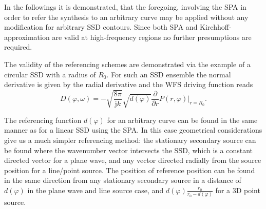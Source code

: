 \documentclass[12pt,a4paper]{article}
\newcommand{\te}{\mathrm{e}}
\newcommand{\ti}{\mathrm{j}}
\newcommand{\sinfi}{\sin\varphi}
\newcommand{\cosfi}{\cos\varphi}
\newcommand{\vxo}{\mathbf{x}_0}
\begin{document}
\vspace{3mm}
In the followings it is demonstrated, that the foregoing, involving the SPA in order to refer the synthesis to an arbitrary curve may be applied without any modification for arbitrary SSD contours. Since both SPA and Kirchhoff-approximation are valid at high-frequency regions no further presumptions are required.

The validity of the referencing schemes are demonstrated via the example of a circular SSD with a radius of $R_0$. For such an SSD ensemble the normal derivative is given by the radial derivative
and the WFS driving function reads
\begin{equation}
D(\varphi,\omega) = - \sqrt{\frac{8\pi}{\ti k}}\sqrt{d(\varphi)} \frac{\partial}{\partial r} \left. P(r,\varphi) \right|_{r = R_0}.
\end{equation}

\vspace{3mm}
The referencing function $d(\varphi)$ for an arbitrary curve can be found in the same manner as for a linear SSD using the SPA. In this case geometrical considerations give us a much simpler referencing method: the stationary secondary source can be found where the wavenumber vector intersects the SSD, which is a constant directed vector for a plane wave, and any vector directed radially from the source position for a line/point source. The position of reference position can be found in the same direction from any stationary secondary source in a distance of $d(\varphi)$ in the plane wave and line source case, and $d(\varphi)\frac{r_0}{r_0-d(\varphi)}$ for a 3D point source.
\end{document}
